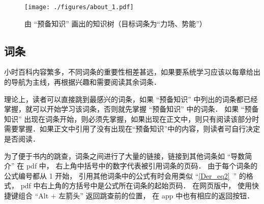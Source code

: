\begin{figure}[ht]
\centering
\texttt{[image: ./figures/about\_1.pdf]}
\caption{由 “预备知识” 画出的知识树（目标词条为“力场、势能”）}\label{about_fig1}
\end{figure}

\subsection{词条}
小时百科内容繁多，不同词条的重要性相差甚远，如果要系统学习应该以每章给出的导航为主线，再根据兴趣和需要阅读其余词条．

理论上，读者可以直接跳到最感兴的词条，如果 “预备知识” 中列出的词条都已经掌握，就可以开始学习该词条，否则就先掌握 “预备知识” 中的词条． 如果 “预备知识” 出现在词条开始，则必须先掌握，如果出现在正文中，则只有阅读该部分时需要掌握．如果正文中引用了没有出现在“预备知识”中的内容，则读者可自行决定是否阅读．

为了便于书内的跳查，词条之间进行了大量的链接，链接到其他词条如 “导数简介” 在 pdf 中， 右上角中括号中的数字代表被引用词条的页码． 由于每个词条的公式编号都从 1 开始， 引用其他词条中的公式有时会用类似 “\autoref{Der_eq2}~” 的格式， pdf 中右上角的方括号中是公式所在词条的起始页码． 在网页版中， 使用快捷键组合 “Alt + 左箭头” 返回跳查前的位置， 在 app 中也有相应的返回按钮．
